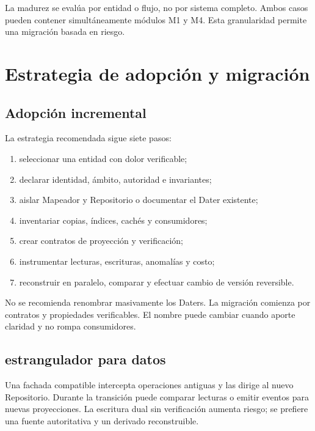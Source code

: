 La madurez se evalúa por entidad o flujo, no por sistema completo. Ambos casos pueden
contener simultáneamente módulos M1 y M4. Esta granularidad permite una migración basada
en riesgo.

\chapter{Estrategia de adopción y migración}

\section{Adopción incremental}

La estrategia recomendada sigue siete pasos:

\begin{enumerate}[leftmargin=*]
  \item seleccionar una entidad con dolor verificable;
  \item declarar identidad, ámbito, autoridad e invariantes;
  \item aislar Mapeador y Repositorio o documentar el Dater existente;
  \item inventariar copias, índices, cachés y consumidores;
  \item crear contratos de proyección y verificación;
  \item instrumentar lecturas, escrituras, anomalías y costo;
  \item reconstruir en paralelo, comparar y efectuar cambio de versión reversible.
\end{enumerate}

No se recomienda renombrar masivamente los Daters. La migración comienza por contratos y
propiedades verificables. El nombre puede cambiar cuando aporte claridad y no rompa
consumidores.

\section{estrangulador para datos}

Una fachada compatible intercepta operaciones antiguas y las dirige al nuevo Repositorio.
Durante la transición puede comparar lecturas o emitir eventos para nuevas proyecciones.
La escritura dual sin verificación aumenta riesgo; se prefiere una fuente autoritativa y
un derivado reconstruible.

